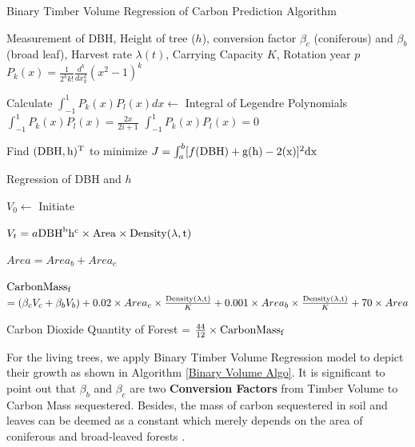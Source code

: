 \documentclass{mcmthesis}
\numberwithin{figure}{section}
\numberwithin{table}{section}
\numberwithin{equation}{section}
\begin{document}
\begin{algorithm}[htbp]
    \caption{Binary Timber Volume Regression of Carbon Prediction Algorithm}\label{Binary Volume Algo}
    \begin{algorithmic}[1]
      \Require
        Measurement of DBH, Height of tree ($ h $), conversion factor 
        $ \beta_c $  (coniferous) and $ \beta_b $ (broad leaf), Harvest rate $ \lambda(t) $, Carrying Capacity $ K $,
        Rotation year $ p $   
        $ P_k(x) = \frac{1}{2^kk!}\frac{d^k}{dx_k^k}(x^2-1)^k $

        \quad \quad Calculate $ \int_{-1}^{1}P_k(x)P_l(x)dx \gets $ Integral of Legendre Polynomials
        $ \int_{-1}^1P_k(x)P_l(x) = \frac{2x}{2i+1} $
        \Else $ \int_{-1}^1P_k(x)P_l(x) = 0 $   
        \EndIf 
        \EndFor
        \EndFor
        \EndFor
        
        \noindent Find $ (\rm{DBH}, h)^T $ to minimize  $ J = \int_a^b[f(\rm{DBH})+g(h)-2(x)]^2dx $


        Regression of DBH and $ h $  

        $V_0 \gets$ Initiate

        $ V_t = a\rm{DBH}^bh^c\times Area\times \rm{Density}(\lambda, t)  $
        \EndIf
        \EndFor

        \noindent$ Area = Area_b + Area_c $

        \noindent $ \rm{CarbonMass_f} $  $= (\beta_cV_c+\beta_bV_b)+0.02\times Area_c\times 
        \frac{\rm{Density}(\lambda,t)}{K}+0.001\times Area_b \times \frac{\rm{Density}(\lambda,t)}{K}+ 70\times Area$

        \Ensure
        Carbon Dioxide Quantity of Forest = $\frac{44}{12}\times\rm{CarbonMass_f}$ 
    \end{algorithmic}
  \end{algorithm}
  For the living trees, we apply Binary Timber Volume Regression model \citep{LuoQingbang} 
  to depict their growth as shown in Algorithm \ref{Binary Volume Algo}. 
  It is significant
  to point out that $ \beta_b $ and $ \beta_c $ are two \textbf{Conversion Factors} from
  Timber Volume to Carbon Mass sequestered. Besides, the mass of carbon sequestered in
  soil and leaves can be deemed as a constant which merely depends on the area
  of coniferous and broad-leaved forests \citep{YanDeren2011}. 
\end{document}
